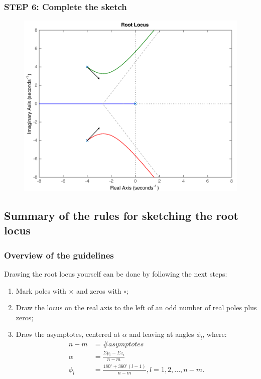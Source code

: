 \begin{frame}
\frametitle{STEP 6: Complete the sketch}
	\begin{exampleblock}{}	
		\begin{figure}
			\centering
			\includegraphics[width=0.7\linewidth]{how_to_draw_ex6}
		\end{figure}
	\end{exampleblock}
\end{frame}

\subsection{Summary of the rules for sketching the root locus}

\begin{frame}
\frametitle{Overview of the guidelines}
\justify
	\begin{block}{}
		Drawing the root locus yourself can be done by following the next steps:
		\vspace{0.5em}
		\begin{enumerate}
			\item Mark poles with $\times$ and zeros with $\circ$;
			\item Draw the locus on the real axis to the left of an odd number of real poles plus zeros;
			\item Draw the asymptotes, centered at $\alpha$ and leaving at angles $\phi_l$, where:
			\vspace{-0.5em}
			\begin{align*}
			n - m &=  \# asymptotes\\
			\alpha &= \frac{\varSigma p_i - \varSigma z_i}{n-m}\\
			\phi_l &= \frac{180^{\circ} + 360^{\circ}(l - 1)}{n - m}, l = 1,2,...,n-m.
			\end{align*}
		\end{enumerate}
	\end{block}
\end{frame}

